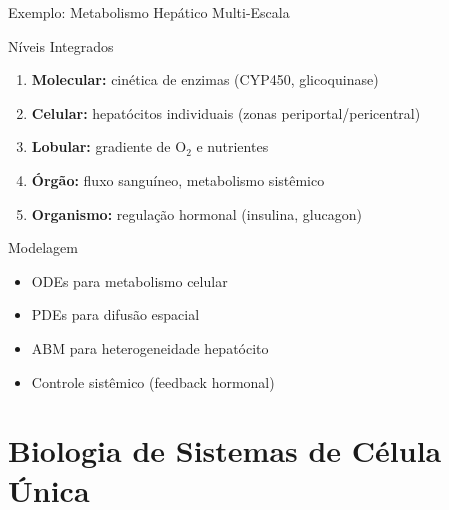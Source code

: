 \begin{frame}{Exemplo: Metabolismo Hepático Multi-Escala}
\begin{block}{Níveis Integrados}
\begin{enumerate}
    \item \textbf{Molecular:} cinética de enzimas (CYP450, glicoquinase)
    \item \textbf{Celular:} hepatócitos individuais (zonas periportal/pericentral)
    \item \textbf{Lobular:} gradiente de O$_2$ e nutrientes
    \item \textbf{Órgão:} fluxo sanguíneo, metabolismo sistêmico
    \item \textbf{Organismo:} regulação hormonal (insulina, glucagon)
\end{enumerate}
\end{block}

\vspace{0.3cm}

\begin{exampleblock}{Modelagem}
\begin{itemize}
    \item ODEs para metabolismo celular
    \item PDEs para difusão espacial
    \item ABM para heterogeneidade hepatócito
    \item Controle sistêmico (feedback hormonal)
\end{itemize}
\end{exampleblock}

\end{frame}

\section{Biologia de Sistemas de Célula Única}

